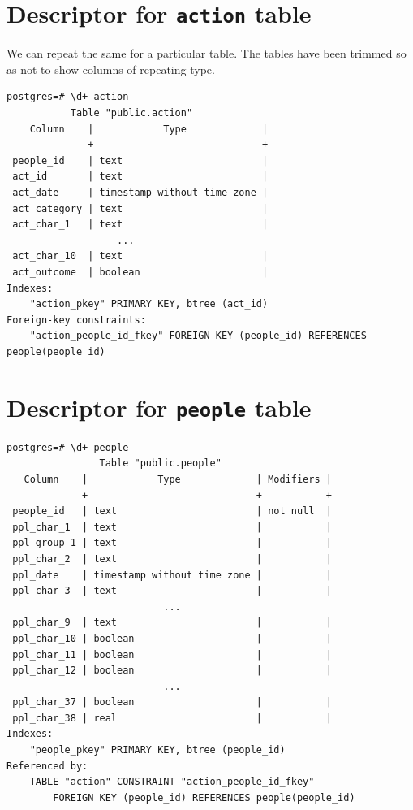 \documentclass[]{report}
\begin{document}
\section{\texorpdfstring{Descriptor for \texttt{action}
table}{Descriptor for action table}}\label{descriptor-for-action-table}

We can repeat the same for a particular table. The tables have been
trimmed so as not to show columns of repeating type.

\begin{verbatim}
postgres=# \d+ action
           Table "public.action"
    Column    |            Type             | 
--------------+-----------------------------+
 people_id    | text                        | 
 act_id       | text                        | 
 act_date     | timestamp without time zone | 
 act_category | text                        | 
 act_char_1   | text                        | 
                   ...
 act_char_10  | text                        | 
 act_outcome  | boolean                     | 
Indexes:
    "action_pkey" PRIMARY KEY, btree (act_id)
Foreign-key constraints:
    "action_people_id_fkey" FOREIGN KEY (people_id) REFERENCES people(people_id)
\end{verbatim}

\pagebreak

\section{\texorpdfstring{Descriptor for \texttt{people}
table}{Descriptor for people table}}\label{descriptor-for-people-table}

\begin{verbatim}
postgres=# \d+ people
                Table "public.people"
   Column    |            Type             | Modifiers |
-------------+-----------------------------+-----------+
 people_id   | text                        | not null  |
 ppl_char_1  | text                        |           |
 ppl_group_1 | text                        |           |
 ppl_char_2  | text                        |           |
 ppl_date    | timestamp without time zone |           |
 ppl_char_3  | text                        |           |
                           ...
 ppl_char_9  | text                        |           |
 ppl_char_10 | boolean                     |           |
 ppl_char_11 | boolean                     |           |
 ppl_char_12 | boolean                     |           |
                           ...
 ppl_char_37 | boolean                     |           |
 ppl_char_38 | real                        |           |
Indexes:
    "people_pkey" PRIMARY KEY, btree (people_id)
Referenced by:
    TABLE "action" CONSTRAINT "action_people_id_fkey" 
        FOREIGN KEY (people_id) REFERENCES people(people_id)
\end{verbatim}
\end{document}
